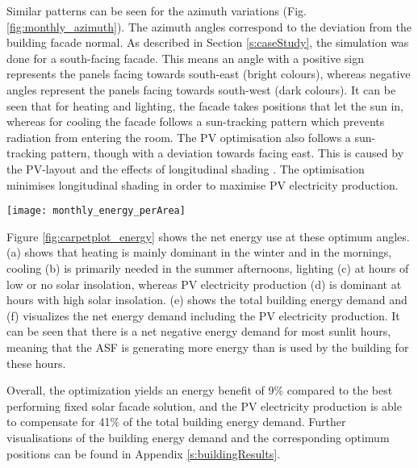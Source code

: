 	Similar patterns can be seen for the azimuth variations (Fig. \ref{fig:monthly_azimuth}). The azimuth angles correspond to the deviation from the building facade normal. As described in Section \ref{s:caseStudy}, the simulation was done for a south-facing facade. This means an angle with a positive sign represents the panels facing towards south-east (bright colours), whereas negative angles represent the panels facing towards south-west (dark colours). It can be seen that for heating and lighting, the facade takes positions that let the sun in, whereas for cooling the facade follows a sun-tracking pattern which prevents radiation from entering the room. The PV optimisation also follows a sun-tracking pattern, though with a deviation towards facing east. This is caused by the PV-layout and the effects of longitudinal shading \cite{hofer2016}. The optimisation minimises longitudinal shading in order to maximise PV electricity production. 

	\begin{figure*}[b!!]
		\begin{center}
		\texttt{[image: monthly\_energy\_perArea]}
		\caption{Carpet plots detailing the net energy consumption. Each square represents the total energy consumption for that specific hour of the entire month. Red colours detail the energy demand, while blue colours detail the energy supply.}
		\label{fig:carpetplot_energy}
		\end{center}
	\end{figure*}

	Figure \ref{fig:carpetplot_energy} shows the net energy use at these optimum angles. (a) shows that heating is mainly dominant in the winter and in the mornings, cooling (b) is primarily needed in the summer afternoons, lighting (c) at hours of low or no solar insolation, whereas PV electricity production (d) is dominant at hours with high solar insolation. (e) shows the total building energy demand and (f) visualizes the net energy demand including the PV electricity production. It can be seen that there is a net negative energy demand for most sunlit hours, meaning that the ASF is generating more energy than is used by the building for these hours. 

	Overall, the optimization yields an energy benefit of 9\% compared to the best performing fixed solar facade solution, and the PV electricity production is able to compensate for 41\% of the total building energy demand. Further visualisations of the building energy demand and the corresponding optimum positions can be found in Appendix \ref{s:buildingResults}. 


